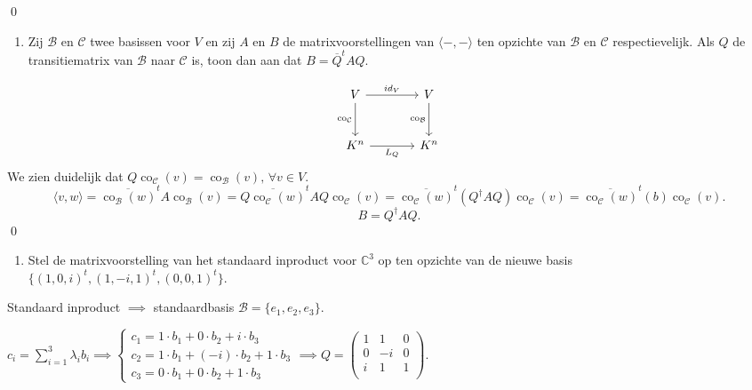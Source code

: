 \begin{oefening}[4.2.4]
    \qed
    \begin{enumerate}
        \item[(b)] Zij $\mathcal{B}$ en $\mathcal{C}$ twee basissen voor $V$ en zij $A$ en $B$ de matrixvoorstellingen van $\langle -, - \rangle$ ten opzichte van $\mathcal{B}$ en $\mathcal{C}$ respectievelijk. Als $Q$ de transitiematrix van $\mathcal{B}$ naar $\mathcal{C}$ is, toon dan aan dat $B = \overline{Q}^t A Q$.
    \end{enumerate}
    \begin{equation*}
    \begin{tikzcd}[row sep=large, column sep=large]
        V \arrow[r, "id_V"] \arrow[d, "\operatorname{co}_{\mathcal{C}}"'] &
        V \arrow[d, "\operatorname{co}_{\mathcal{B}}"'] \\
        K^n \arrow[r, "L_Q"'] &
        K^n
    \end{tikzcd}
    \end{equation*}
    We zien duidelijk dat \(Q \operatorname{co}_{\mathcal{C}} (v) = \operatorname{co}_{\mathcal{B}}(v), \, \forall v \in V\).
    \[
    \langle v,w \rangle
    = \overline{\operatorname{co}_{\mathcal{B}}(w)}^t A \operatorname{co}_{\mathcal{B}}(v)
    = \overline{Q \operatorname{co}_{\mathcal{C}}(w)}^t A Q \operatorname{co}_{\mathcal{C}} (v)
    = \overline{\operatorname{co}_{\mathcal{C}}(w)}^t( Q^\dagger A Q )\operatorname{co}_{\mathcal{C}} (v)
    = \overline{\operatorname{co}_{\mathcal{C}}(w)}^t(b)\operatorname{co}_{\mathcal{C}} (v).
    \]
    \[
    B = Q^\dagger A Q .
    \]
    \qed
    \begin{enumerate}
        \item[(c)] Stel de matrixvoorstelling van het standaard inproduct voor $\mathbb{C}^3$ op ten opzichte van de nieuwe basis $\{(1, 0, i)^t, (1, -i, 1)^t, (0, 0, 1)^t\}$.
    \end{enumerate}
    Standaard inproduct \(\implies\) standaardbasis \(\mathcal{B} = \{e_1,e_2,e_3\}\).

    \(c_i = \sum_{i=1}^{3} \lambda_i b_i \implies
    \begin{cases}
        c_1 = 1 \cdot b_1 + 0 \cdot b_2 + i \cdot b_3 \\
        c_2 = 1 \cdot b_1 + (-i) \cdot b_2 + 1 \cdot b_3\\
        c_3 = 0 \cdot b_1 + 0 \cdot b_2 + 1 \cdot b_3
    \end{cases}
    \implies
    Q=
    \begin{pmatrix}
        1 & 1 & 0\\
        0 & -i & 0 \\
        i & 1 & 1\\
    \end{pmatrix}
    \).


\end{oefening}
